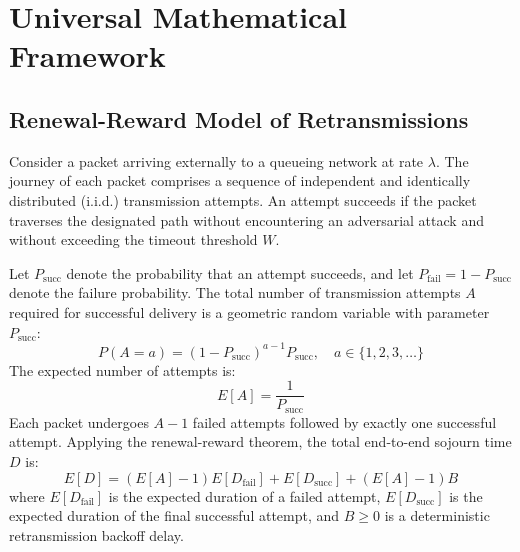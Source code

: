 \documentclass[12pt,onecolumn]{article}
\begin{document}
\section{Universal Mathematical Framework}
\subsection{Renewal-Reward Model of Retransmissions}
Consider a packet arriving externally to a queueing network at rate $\lambda$. The journey of each packet comprises a sequence of independent and identically distributed (i.i.d.) transmission attempts. An attempt succeeds if the packet traverses the designated path without encountering an adversarial attack and without exceeding the timeout threshold $W$.

Let $P_{\text{succ}}$ denote the probability that an attempt succeeds, and let $P_{\text{fail}} = 1 - P_{\text{succ}}$ denote the failure probability. The total number of transmission attempts $A$ required for successful delivery is a geometric random variable with parameter $P_{\text{succ}}$:
\begin{equation}
P(A = a) = (1 - P_{\text{succ}})^{a-1} P_{\text{succ}}, \quad a \in \{1, 2, 3, \dots\}
\end{equation}
The expected number of attempts is:
\begin{equation}
E[A] = \frac{1}{P_{\text{succ}}}
\end{equation}
Each packet undergoes $A - 1$ failed attempts followed by exactly one successful attempt. Applying the renewal-reward theorem, the total end-to-end sojourn time $D$ is:
\begin{equation}
E[D] = (E[A] - 1) E[D_{\text{fail}}] + E[D_{\text{succ}}] + (E[A] - 1) B
\label{eq:general_delay}
\end{equation}
where $E[D_{\text{fail}}]$ is the expected duration of a failed attempt, $E[D_{\text{succ}}]$ is the expected duration of the final successful attempt, and $B \ge 0$ is a deterministic retransmission backoff delay.
\end{document}

